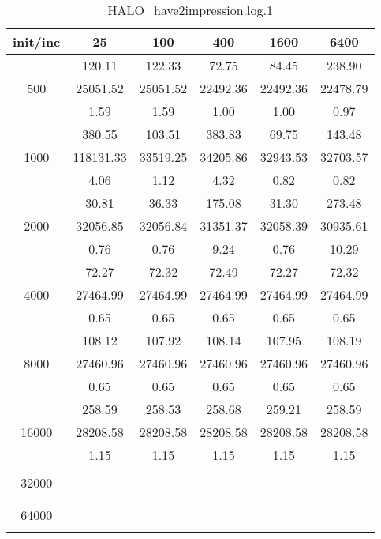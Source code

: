 \begin{table}[th]
\caption{HALO\_have2impression.log.1}
\label{tab:HALO_have2impression.log.1}
\centering
\begin{tabular}{|c||c|c|c|c|c|}
\hline
init/inc & 25 & 100 & 400 & 1600 & 6400 \\ \hline \hline
  & 120.11 & 122.33 & 72.75 & 84.45 & 238.90\\ 
500  & 25051.52 & 25051.52 & 22492.36 & 22492.36 & 22478.79\\ 
  & 1.59 & 1.59 & 1.00 & 1.00 & 0.97\\ \hline 
  & 380.55 & 103.51 & 383.83 & 69.75 & 143.48\\ 
1000  & 118131.33 & 33519.25 & 34205.86 & 32943.53 & 32703.57\\ 
  & 4.06 & 1.12 & 4.32 & 0.82 & 0.82\\ \hline 
  & 30.81 & 36.33 & 175.08 & 31.30 & 273.48\\ 
2000  & 32056.85 & 32056.84 & 31351.37 & 32058.39 & 30935.61\\ 
  & 0.76 & 0.76 & 9.24 & 0.76 & 10.29\\ \hline 
  & 72.27 & 72.32 & 72.49 & 72.27 & 72.32\\ 
4000  & 27464.99 & 27464.99 & 27464.99 & 27464.99 & 27464.99\\ 
  & 0.65 & 0.65 & 0.65 & 0.65 & 0.65\\ \hline 
  & 108.12 & 107.92 & 108.14 & 107.95 & 108.19\\ 
8000  & 27460.96 & 27460.96 & 27460.96 & 27460.96 & 27460.96\\ 
  & 0.65 & 0.65 & 0.65 & 0.65 & 0.65\\ \hline 
  & 258.59 & 258.53 & 258.68 & 259.21 & 258.59\\ 
16000  & 28208.58 & 28208.58 & 28208.58 & 28208.58 & 28208.58\\ 
  & 1.15 & 1.15 & 1.15 & 1.15 & 1.15\\ \hline 
  &  &  &  &  & \\ 
32000  &  &  &  &  & \\ 
  &  &  &  &  & \\ \hline 
  &  &  &  &  & \\ 
64000  &  &  &  &  & \\ 
  &  &  &  &  & \\ \hline 
\end{tabular}
\end{table}

